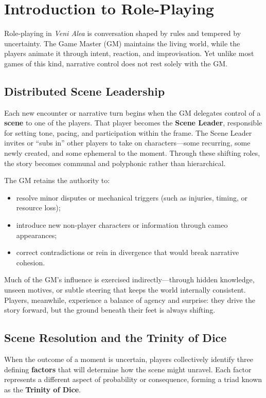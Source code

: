 \section{Introduction to Role-Playing}

Role-playing in \textit{Veni Alea} is conversation shaped by rules and tempered by uncertainty.  
The Game Master (GM) maintains the living world, while the players animate it through intent, reaction, and improvisation.  
Yet unlike most games of this kind, narrative control does not rest solely with the GM.

\subsection*{Distributed Scene Leadership}

Each new encounter or narrative turn begins when the GM delegates control of a \textbf{scene} to one of the players.  
That player becomes the \textbf{Scene Leader}, responsible for setting tone, pacing, and participation within the frame.  
The Scene Leader invites or “subs in” other players to take on characters—some recurring, some newly created, and some ephemeral to the moment.  
Through these shifting roles, the story becomes communal and polyphonic rather than hierarchical.

The GM retains the authority to:
\begin{itemize}
  \item resolve minor disputes or mechanical triggers (such as injuries, timing, or resource loss);
  \item introduce new non-player characters or information through cameo appearances;
  \item correct contradictions or rein in divergence that would break narrative cohesion.
\end{itemize}

Much of the GM’s influence is exercised indirectly—through hidden knowledge, unseen motives, or subtle steering that keeps the world internally consistent.  
Players, meanwhile, experience a balance of agency and surprise: they drive the story forward, but the ground beneath their feet is always shifting.

\subsection*{Scene Resolution and the Trinity of Dice}

When the outcome of a moment is uncertain, players collectively identify three defining \textbf{factors} that will determine how the scene might unravel.  
Each factor represents a different aspect of probability or consequence, forming a triad known as the \textbf{Trinity of Dice}.

